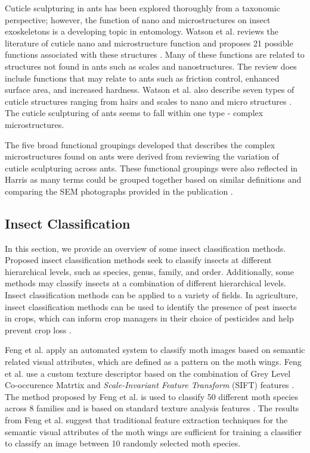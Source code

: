 \documentclass{aci}
\numberwithin{equation}{section}
\begin{document}
Cuticle sculpturing in ants has been explored thoroughly from a taxonomic
perspective; however, the function of nano and microstructures on insect
exoskeletons is a developing topic in entomology. Watson et al. reviews the
literature of cuticle nano and microstructure function and proposes 21 possible
functions associated with these structures \cite{watson_diversity_2017}. Many of
these functions are related to structures not found in ants such as scales and
nanostructures. The review does include functions that may relate to ants such
as friction control, enhanced surface area, and increased hardness.  Watson et
al. also describe seven types of cuticle structures ranging from hairs and
scales to nano and micro structures \cite{watson_diversity_2017}. The cuticle
sculpturing of ants seems to fall within one type - complex microstructures.

The five broad functional groupings developed that describes the complex
microstructures found on ants were derived from reviewing the variation of
cuticle sculpturing across ants. These functional groupings were also reflected
in Harris as many terms could be grouped together based on similar definitions
and comparing the SEM photographs provided in the publication
\cite{harris_glossary_1979}.

\subsection{Insect Classification}

In this section, we provide an overview of some insect classification methods.
Proposed insect classification methods seek to classify insects at different
hierarchical levels, such as species, genus, family, and order. Additionally,
some methods may classify insects at a combination of different hierarchical
levels. Insect classification methods can be applied to a variety of fields. In
agriculture, insect classification methods can be used to identify the presence
of pest insects in crops, which can inform crop managers in their choice of
pesticides and help prevent crop loss \cite{liu_pestnet_2019,
    kasinathan_machine_2021}.

Feng et al. \cite{feng_automated_2013} apply an automated system to classify
moth images based on semantic related visual attributes, which are defined as a
pattern on the moth wings. Feng et al. \cite{feng_automated_2013} use a custom
texture descriptor based on the combination of Grey Level Co-occurence Matrtix
and \textit{Scale-Invariant Feature Transform} (SIFT) features
\cite{gotlieb_texture_1990, lowe_distinctive_2004}. The method proposed by Feng
et al. \cite{feng_automated_2013} is used to classify 50 different moth species
across 8 families and is based on standard texture analysis features
\cite{feng_automated_2013}. The results from Feng et al.
\cite{feng_automated_2013} suggest that traditional feature extraction
techniques for the semantic visual attributes of the moth wings are sufficient
for training a classifier to classify an image between 10 randomly selected moth
species.
\end{document}
